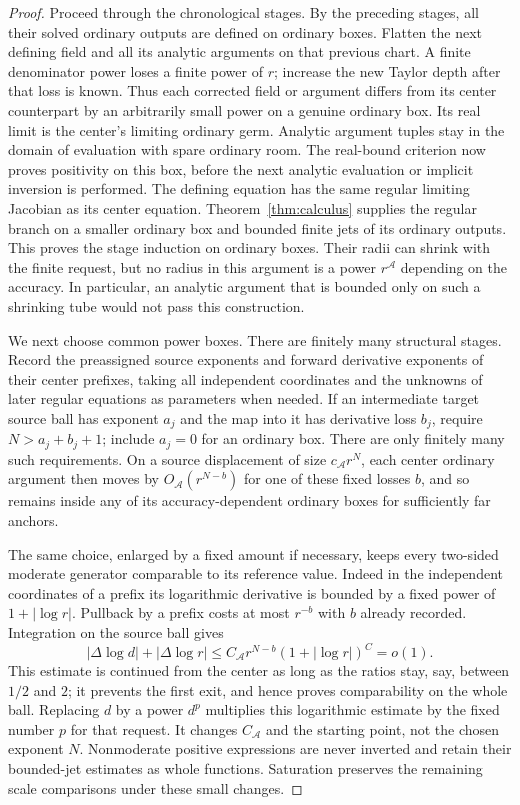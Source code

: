 \begin{proof}
Proceed through the chronological stages.  By the preceding stages,
all their solved ordinary outputs are defined on ordinary boxes.
Flatten the next defining field and all its analytic arguments on
that previous chart.  A finite denominator power loses a finite
power of $r$; increase the new Taylor depth after that loss is
known.  Thus each corrected field or argument differs from its
center counterpart by an arbitrarily small power on a genuine
ordinary box.  Its real limit is the center's limiting ordinary
germ.  Analytic argument tuples stay in the domain of evaluation
with spare ordinary room.  The real-bound criterion now proves
positivity on this box, before the next analytic evaluation or
implicit inversion is performed.  The defining equation has the
same regular limiting Jacobian as its center equation.
Theorem~\ref{thm:calculus} supplies the regular branch on a smaller
ordinary box and bounded finite jets of its ordinary outputs.
This proves the stage induction on ordinary boxes.  Their radii
can shrink with the finite request, but no radius in this argument
is a power $r^{\mathcal A}$ depending on the accuracy.  In particular, an
analytic argument that is bounded only on such a shrinking tube
would not pass this construction.

We next choose common power boxes.  There are finitely many
structural stages.  Record the preassigned source exponents and
forward derivative exponents of their center prefixes, taking all
independent coordinates and the unknowns of later regular
equations as parameters when needed.  If an intermediate target
source ball has exponent $a_j$ and the map into it has derivative
loss $b_j$, require $N>a_j+b_j+1$; include $a_j=0$ for an
ordinary box.  There are only finitely many such requirements.
On a source displacement of size $c_{\mathcal A} r^N$,
each center ordinary argument then moves by $O_{\mathcal A}(r^{N-b})$ for
one of these fixed losses $b$, and so remains inside any of its
accuracy-dependent ordinary boxes for sufficiently far anchors.

The same choice, enlarged by a fixed amount if necessary, keeps
every two-sided moderate generator comparable to its reference value.
Indeed in the independent coordinates of a prefix its logarithmic
derivative is bounded by a fixed power of $1+|\log r|$.
Pullback by a prefix costs at most $r^{-b}$ with $b$ already
recorded.  Integration on the source ball gives
\[
 |\Delta\log d|+|\Delta\log r|
 \le C_{\mathcal A} r^{N-b}(1+|\log r|)^C=o(1).
\]
This estimate is continued from the center as long as the ratios
stay, say, between $1/2$ and $2$; it prevents the first exit, and
hence proves comparability on the whole ball.  Replacing $d$ by a
power $d^p$ multiplies this logarithmic estimate by the fixed
number $p$ for that request.  It changes $C_{\mathcal A}$ and the starting
point, not the chosen exponent $N$.  Nonmoderate positive
expressions are never inverted and retain their bounded-jet
estimates as whole functions.  Saturation preserves the remaining
scale comparisons under these small changes.


\end{proof}
